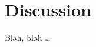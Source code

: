 \cleardoublepage


\chapter{Discussion}\label{sec:again_something}

Blah, blah \dots

 \cleardoublepage
